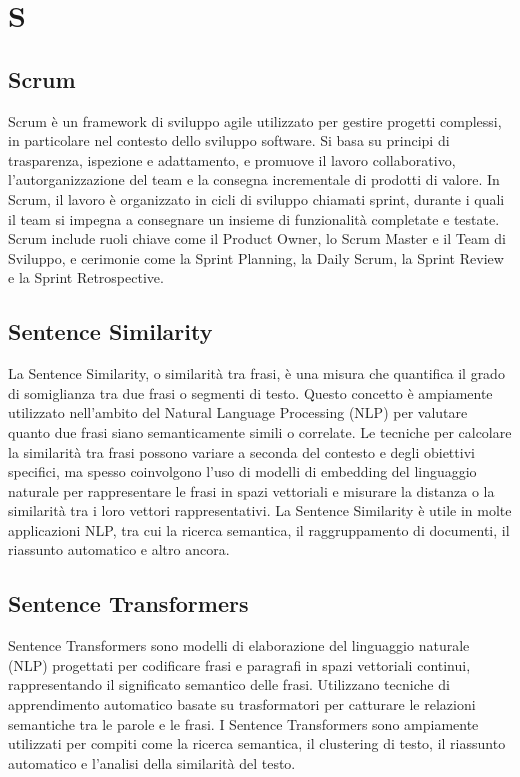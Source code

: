 \section{S}

\vspace{2em}
\subsection*{Scrum}
Scrum è un framework di sviluppo agile utilizzato per gestire progetti complessi, in particolare nel contesto dello sviluppo software. Si basa su principi di trasparenza, ispezione e adattamento, e promuove il lavoro collaborativo, l'autorganizzazione del team e la consegna incrementale di prodotti di valore. In Scrum, il lavoro è organizzato in cicli di sviluppo chiamati sprint, durante i quali il team si impegna a consegnare un insieme di funzionalità completate e testate. Scrum include ruoli chiave come il Product Owner, lo Scrum Master e il Team di Sviluppo, e cerimonie come la Sprint Planning, la Daily Scrum, la Sprint Review e la Sprint Retrospective.

\vspace{2em}
\subsection*{Sentence Similarity}
La Sentence Similarity, o similarità tra frasi, è una misura che quantifica il grado di somiglianza tra due frasi o segmenti di testo. Questo concetto è ampiamente utilizzato nell'ambito del Natural Language Processing (NLP) per valutare quanto due frasi siano semanticamente simili o correlate. Le tecniche per calcolare la similarità tra frasi possono variare a seconda del contesto e degli obiettivi specifici, ma spesso coinvolgono l'uso di modelli di embedding del linguaggio naturale per rappresentare le frasi in spazi vettoriali e misurare la distanza o la similarità tra i loro vettori rappresentativi. La Sentence Similarity è utile in molte applicazioni NLP, tra cui la ricerca semantica, il raggruppamento di documenti, il riassunto automatico e altro ancora.

\vspace{2em}
\subsection*{Sentence Transformers}
Sentence Transformers sono modelli di elaborazione del linguaggio naturale (NLP) progettati per codificare frasi e paragrafi in spazi vettoriali continui, rappresentando il significato semantico delle frasi. Utilizzano tecniche di apprendimento automatico basate su trasformatori per catturare le relazioni semantiche tra le parole e le frasi. I Sentence Transformers sono ampiamente utilizzati per compiti come la ricerca semantica, il clustering di testo, il riassunto automatico e l'analisi della similarità del testo.

